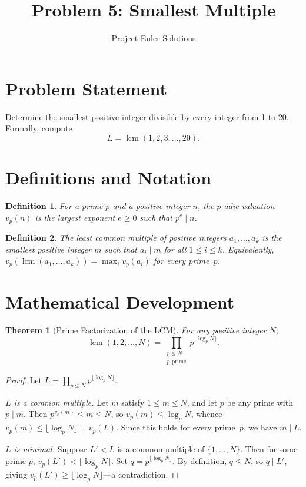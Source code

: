 \documentclass[11pt]{article}
\title{Problem 5: Smallest Multiple}
\author{Project Euler Solutions}
\date{}
\newtheorem{theorem}{Theorem}
\newtheorem{definition}{Definition}
\begin{document}
\maketitle

\section{Problem Statement}

Determine the smallest positive integer divisible by every integer from 1 to 20. Formally, compute
\[
L = \operatorname{lcm}(1, 2, 3, \ldots, 20).
\]

\section{Definitions and Notation}

\begin{definition}
For a prime $p$ and a positive integer $n$, the \emph{$p$-adic valuation} $v_p(n)$ is the largest exponent $e \ge 0$ such that $p^e \mid n$.
\end{definition}

\begin{definition}
The \emph{least common multiple} of positive integers $a_1, \ldots, a_k$ is the smallest positive integer $m$ such that $a_i \mid m$ for all $1 \le i \le k$. Equivalently, $v_p(\operatorname{lcm}(a_1, \ldots, a_k)) = \max_i v_p(a_i)$ for every prime~$p$.
\end{definition}

\section{Mathematical Development}

\begin{theorem}[Prime Factorization of the LCM]\label{thm:lcm}
For any positive integer $N$,
\[
\operatorname{lcm}(1, 2, \ldots, N) = \prod_{\substack{p \le N \\ p \text{ prime}}} p^{\lfloor \log_p N \rfloor}.
\]
\end{theorem}

\begin{proof}
Let $L = \prod_{p \le N} p^{\lfloor \log_p N \rfloor}$.

\emph{$L$ is a common multiple.} Let $m$ satisfy $1 \le m \le N$, and let $p$ be any prime with $p \mid m$. Then $p^{v_p(m)} \le m \le N$, so $v_p(m) \le \log_p N$, whence $v_p(m) \le \lfloor \log_p N \rfloor = v_p(L)$. Since this holds for every prime~$p$, we have $m \mid L$.

\emph{$L$ is minimal.} Suppose $L' < L$ is a common multiple of $\{1, \ldots, N\}$. Then for some prime $p$, $v_p(L') < \lfloor \log_p N \rfloor$. Set $q = p^{\lfloor \log_p N \rfloor}$. By definition, $q \le N$, so $q \mid L'$, giving $v_p(L') \ge \lfloor \log_p N \rfloor$---a contradiction.
\end{proof}
\end{document}
